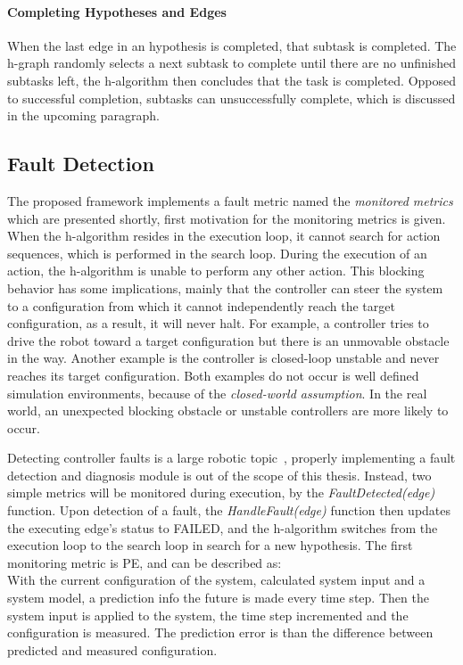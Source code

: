 \paragraph{Completing Hypotheses and Edges}
When the last edge in an hypothesis is completed, that subtask is completed. The \ac{h-graph} randomly selects a next subtask to complete until there are no unfinished subtasks left, the \ac{h-algorithm} then concludes that the task is completed. Opposed to successful completion, subtasks can unsuccessfully complete, which is discussed in the upcoming paragraph.\bs

\subsection{Fault Detection}%
\label{sec:monitoring_metrics}
The proposed framework implements a fault metric named the \textit{monitored metrics} which are presented shortly, first motivation for the monitoring metrics is given. When the \ac{h-algorithm} resides in the execution loop, it cannot search for action sequences, which is performed in the search loop. During the execution of an action, the \acl{h-algorithm} is unable to perform any other action. This blocking behavior has some implications, mainly that the controller can steer the system to a configuration from which it cannot independently reach the target configuration, as a result, it will never halt. For example, a controller tries to drive the robot toward a target configuration but there is an unmovable obstacle in the way. Another example is the controller is closed-loop unstable and never reaches its target configuration. Both examples do not occur is well defined simulation environments, because of the \textit{closed-world assumption}. In the real world, an unexpected blocking obstacle or unstable controllers are more likely to occur.\bs

Detecting controller faults is a large robotic topic~\cite{khalastchi_fault_2019}, properly implementing a fault detection and diagnosis module is out of the scope of this thesis. Instead, two simple metrics will be monitored during execution, by the \textit{FaultDetected(\gls{edge})} function. Upon detection of a fault, the \textit{HandleFault(\gls{edge})} function then updates the executing edge's status to FAILED, and the \ac{h-algorithm} switches from the execution loop to the search loop in search for a new hypothesis. The first monitoring metric is \acl{PE}, and can be described as:\\
With the current configuration of the system, calculated system input and a system model, a prediction info the future is made every time step. Then the system input is applied to the system, the time step incremented and the configuration is measured. The prediction error is than the difference between predicted and measured configuration.\bs

